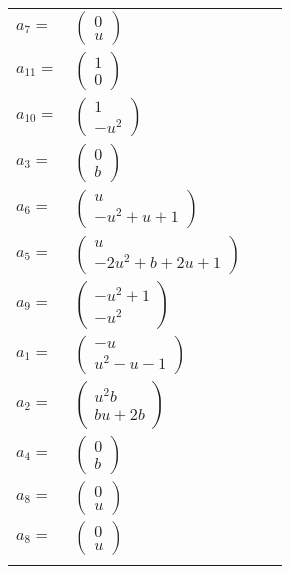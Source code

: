 \documentclass[1p]{elsarticle_modified}
\theoremstyle{definition}
\begin{document}
\begin{tabular}{m{7pt} m{180pt} m{7pt} m{180pt} }
\flushright $a_{7}=$&$\begin{pmatrix}0\\u\end{pmatrix}$ \\
\flushright $a_{11}=$&$\begin{pmatrix}1\\0\end{pmatrix}$ \\
\flushright $a_{10}=$&$\begin{pmatrix}1\\- u^2\end{pmatrix}$ \\
\flushright $a_{3}=$&$\begin{pmatrix}0\\b\end{pmatrix}$ \\
\flushright $a_{6}=$&$\begin{pmatrix}u\\- u^2+u+1\end{pmatrix}$ \\
\flushright $a_{5}=$&$\begin{pmatrix}u\\-2 u^2+b+2 u+1\end{pmatrix}$ \\
\flushright $a_{9}=$&$\begin{pmatrix}- u^2+1\\- u^2\end{pmatrix}$ \\
\flushright $a_{1}=$&$\begin{pmatrix}- u\\u^2- u-1\end{pmatrix}$ \\
\flushright $a_{2}=$&$\begin{pmatrix}u^2 b\\b u+2 b\end{pmatrix}$ \\
\flushright $a_{4}=$&$\begin{pmatrix}0\\b\end{pmatrix}$ \\
\flushright $a_{8}=$&$\begin{pmatrix}0\\u\end{pmatrix}$\\ \flushright $a_{8}=$&$\begin{pmatrix}0\\u\end{pmatrix}$\\&\end{tabular}
\end{document}

